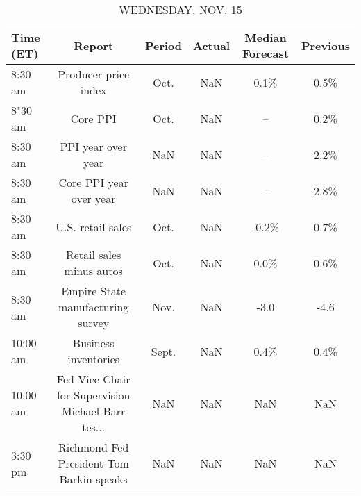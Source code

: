 \documentclass{article}%
\begin{document}
%


\begin{table}[htbp]%
\caption{WEDNESDAY, NOV. 15}%
\centering%
\begin{adjustbox}{width=1\textwidth}%
\begin{tabular}{lccccc}
\toprule
Time (ET) &                                             Report & Period & Actual & Median Forecast & Previous \\
\midrule
  8:30 am &                               Producer price index &   Oct. &    NaN &            0.1\% &     0.5\% \\
  8"30 am &                                           Core PPI &   Oct. &    NaN &              -- &     0.2\% \\
  8:30 am &                                 PPI year over year &    NaN &    NaN &              -- &     2.2\% \\
  8:30 am &                            Core PPI year over year &    NaN &    NaN &              -- &     2.8\% \\
  8:30 am &                                  U.S. retail sales &   Oct. &    NaN &           -0.2\% &     0.7\% \\
  8:30 am &                           Retail sales minus autos &   Oct. &    NaN &            0.0\% &     0.6\% \\
  8:30 am &                  Empire State manufacturing survey &   Nov. &    NaN &            -3.0 &     -4.6 \\
 10:00 am &                               Business inventories &  Sept. &    NaN &            0.4\% &     0.4\% \\
 10:00 am & Fed Vice Chair for Supervision Michael Barr tes... &    NaN &    NaN &             NaN &      NaN \\
  3:30 pm &           Richmond Fed President Tom Barkin speaks &    NaN &    NaN &             NaN &      NaN \\
\bottomrule
\end{tabular}
%
\end{adjustbox}%
\end{table}

%
\end{document}
